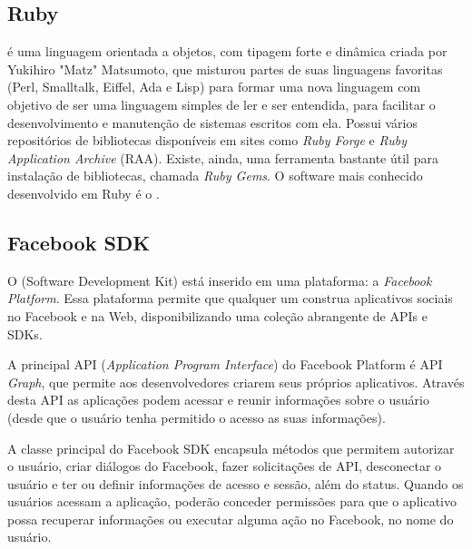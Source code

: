 \subsection{Ruby}

\citeauthor{ruby2017} é uma linguagem orientada a objetos, com tipagem forte e dinâmica criada por Yukihiro "Matz" Matsumoto, que misturou partes de suas linguagens favoritas (Perl, Smalltalk, Eiffel, Ada e Lisp) para formar uma nova linguagem com objetivo de ser uma linguagem simples de ler e ser entendida, para facilitar o desenvolvimento e manutenção de sistemas escritos com ela. Possui vários repositórios de bibliotecas disponíveis em sites como \textit{Ruby Forge} e \textit{Ruby Application Archive} (RAA). Existe, ainda, uma ferramenta bastante útil para instalação de bibliotecas, chamada \textit{Ruby Gems}. O software mais conhecido desenvolvido em Ruby é o \citeauthor{rubyonrails}.

\subsection{Facebook SDK}

O \citeauthor{facebooksdk} (Software Development Kit) está inserido em uma plataforma: a \textit{Facebook Platform}. Essa plataforma permite que qualquer um construa aplicativos sociais no Facebook e na Web, disponibilizando uma coleção abrangente de APIs e SDKs.

A principal API (\textit{Application Program Interface}) do Facebook Platform é API \textit{Graph}, que permite aos desenvolvedores criarem seus próprios aplicativos. Através desta API as aplicações podem acessar e reunir informações sobre o usuário (desde que o usuário tenha permitido o acesso as suas informações). 

A classe principal do Facebook SDK encapsula métodos que permitem autorizar o usuário, criar diálogos do Facebook, fazer solicitações de API, desconectar o usuário e ter ou definir informações de acesso e sessão, além do status. Quando os usuários acessam a aplicação,  poderão conceder permissões para que o aplicativo possa recuperar informações ou executar alguma ação no Facebook, no nome do usuário.


